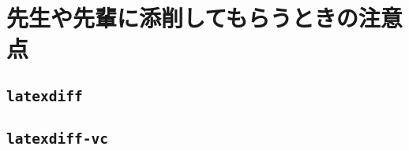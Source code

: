 \chapter{先生や先輩に添削してもらうときの注意点}
\label{ch:check}


\section{\texttt{latexdiff}}
\label{sec:latexdiff}



\section{\texttt{latexdiff-vc}}
\label{sec:latexdiff-vc}

